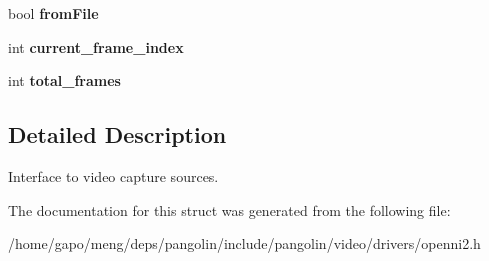 \begin{DoxyCompactItemize}
\item 
bool {\bfseries from\+File}\hypertarget{structpangolin_1_1_open_ni_video2_ab26a4c783672fe293bc07211d05fc25b}{}\label{structpangolin_1_1_open_ni_video2_ab26a4c783672fe293bc07211d05fc25b}

\item 
int {\bfseries current\+\_\+frame\+\_\+index}\hypertarget{structpangolin_1_1_open_ni_video2_a1abbc73d4b9dceea8ceeaa6657f1e471}{}\label{structpangolin_1_1_open_ni_video2_a1abbc73d4b9dceea8ceeaa6657f1e471}

\item 
int {\bfseries total\+\_\+frames}\hypertarget{structpangolin_1_1_open_ni_video2_a77ba8f227738d995ded204b8b14704c5}{}\label{structpangolin_1_1_open_ni_video2_a77ba8f227738d995ded204b8b14704c5}

\end{DoxyCompactItemize}


\subsection{Detailed Description}
Interface to video capture sources. 

The documentation for this struct was generated from the following file\+:\begin{DoxyCompactItemize}
\item 
/home/gapo/meng/deps/pangolin/include/pangolin/video/drivers/openni2.\+h\end{DoxyCompactItemize}
